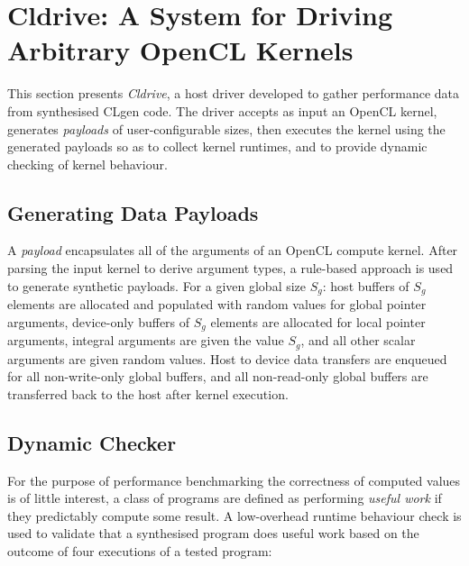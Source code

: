 \section{Cldrive: A System for Driving Arbitrary OpenCL Kernels}
\label{sec:cldrive}

This section presents \emph{Cldrive}, a host driver developed to gather performance data from synthesised CLgen code. The driver accepts as input an OpenCL kernel, generates \emph{payloads} of user-configurable sizes, then executes the kernel using the generated payloads so as to collect kernel runtimes, and to provide dynamic checking of kernel behaviour.

\subsection{Generating Data Payloads}

A \emph{payload} encapsulates all of the arguments of an OpenCL compute kernel. After parsing the input kernel to derive argument types, a rule-based approach is used to generate synthetic payloads. For a given global size $S_g$: host buffers of $S_g$ elements are allocated and populated with random values for global pointer arguments, device-only buffers of $S_g$ elements are allocated for local pointer arguments, integral arguments are given the value $S_g$, and all other scalar arguments are given random values. Host to device data transfers are enqueued for all non-write-only global buffers, and all non-read-only global buffers are transferred back to the host after kernel execution.

\subsection{Dynamic Checker}

For the purpose of performance benchmarking the correctness of computed values is of little interest, a class of programs are defined as performing \emph{useful work} if they predictably compute some result. A low-overhead runtime behaviour check is used to validate that a synthesised program does useful work based on the outcome of four executions of a tested program:

